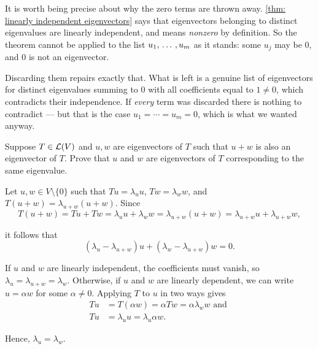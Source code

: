 \begin{ainote}
  It is worth being precise about why the zero terms are thrown away. \ref{thm: linearly independent eigenvectors} says that eigenvectors belonging to distinct eigenvalues are linearly independent, and  means \emph{nonzero} by definition. So the theorem cannot be applied to the list $u_1, {\, \ldots \,\,}, u_m$ as it stands: some $u_j$ may be $0$, and $0$ is not an eigenvector.

  Discarding them repairs exactly that. What is left is a genuine list of eigenvectors for distinct eigenvalues summing to $0$ with all coefficients equal to $1 \neq 0$, which contradicts their independence. If \emph{every} term was discarded there is nothing to contradict --- but that is the case $u_1 = \cdots = u_m = 0$, which is what we wanted anyway.
\end{ainote}

\begin{xrcs}
  Suppose $T \in \mathcal{L} (V)$ and $u,w$ are eigenvectors of $T$ such that $u + w$ is also an eigenvector of $T$. Prove that $u$ and $w$ are eigenvectors of $T$ corresponding to the same eigenvalue.

  \begin{xprf}
    Let $u,w \in V \setminus \{0\}$ such that $T u = \lambda_u u$, $T w = \lambda_w w$, and $T (u+w) = \lambda_{u+w} (u+w)$. Since
    \begin{equation}
      T (u + w) =  T u + T w = \lambda_u u + \lambda_w w = \lambda_{u+w} (u + w) = \lambda_{u+w} u + \lambda_{u+w} w,
    \end{equation}

    it follows that
    \begin{equation}
      \left(\lambda_u -  \lambda_{u+w}\right) u + \left(\lambda_w -  \lambda_{u+w}\right) w = 0.
    \end{equation}

    If $u$ and $w$ are linearly independent, the coefficients must vanish, so $\lambda_u =  \lambda_{u+w} = \lambda_w$. Otherwise, if $u$ and $w$ are linearly dependent, we can write $u = \alpha w$ for some $\alpha \neq 0$. Applying $T$ to $u$ in two ways gives
    \begin{equation}
      \begin{aligned}
        T u &= T(\alpha w) = \alpha T w = \alpha \lambda_w w \text{ and }  \\
        T u &= \lambda_u u= \lambda_u \alpha w.
      \end{aligned}
    \end{equation}

    Hence, $\lambda_u = \lambda_w$.
  \end{xprf}
\end{xrcs}


